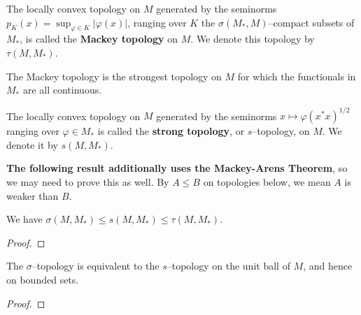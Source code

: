 
\begin{definition}
  \label{def:Mackey_top}
  The locally convex topology on $M$ generated by the seminorms $p_{K}(x)=\sup_{\varphi\in K}|\varphi(x)|$, ranging over
  $K$ the $\sigma(M_{*},M)$--compact subsets of $M_{*}$, is called the \textbf{Mackey topology} on $M$.
  We denote this topology by $\tau(M,M_{*})$.
\end{definition}

The Mackey topology is the strongest topology on $M$ for which the functionals in $M_{*}$ are all continuous.

\begin{definition}
  \label{def:strong_top}
  The locally convex topology on $M$ generated by the seminorms $x\mapsto \varphi(x^{*}x)^{1/2}$ ranging over $\varphi\in M_{*}$ is
  called the \textbf{strong topology}, or $s$--topology, on $M$. We denote it by $s(M,M_{*})$.
\end{definition}

\textbf{The following result additionally uses the Mackey-Arens Theorem}, so we may need to prove this as well.
By $A\le B$ on topologies below, we mean $A$ is weaker than $B$.

\begin{theorem}
  \label{thm:sigma_le_s_le_tau}
  We have $\sigma(M,M_{*})\le s(M,M_{*})\le \tau(M,M_{*})$.
\end{theorem}

\begin{proof}
\end{proof}

\begin{corollary}
  \label{cor:sigma_eq_s_on_ball}
  The $\sigma$--topology is equivalent to the $s$--topology on the unit ball of $M$, and hence on bounded sets.
\end{corollary}

\begin{proof}
\end{proof}
